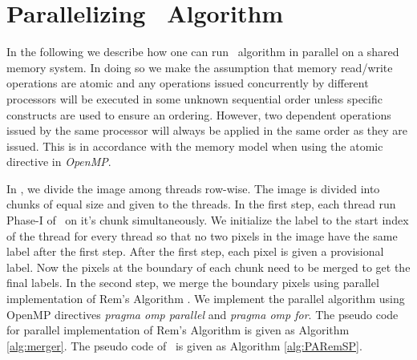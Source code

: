 \section{Parallelizing \aremsp\ Algorithm}
\label{sec:parallel_algo}

In the following we describe how one can run \aremsp\ algorithm in parallel
on a shared memory system. In doing so we make the assumption that memory read/write 
operations are atomic and any operations issued concurrently by different processors will be executed in some unknown 
sequential order unless specific constructs are used to ensure an ordering.
However, two dependent operations issued by 
the same processor will always be applied in the same order as they are issued. 
This is in accordance with the memory model when using the atomic directive in
{\em OpenMP}.

In \paremsp, we divide the image among threads row-wise. The image is
divided into chunks of equal size and given to the threads. In the first step,
each thread run Phase-I of \aremsp\ on it's chunk simultaneously. We
initialize the label to the start index of the thread for every thread so that no 
two pixels in the image have the same label after the first step. After the first step, 
each pixel is given a provisional label. Now the pixels at the boundary of each chunk need to 
be merged to get the final labels. In the second step, we merge the boundary pixels using parallel 
implementation of Rem's Algorithm \cite{Patwary2012_PARemSP}. We implement the parallel algorithm using
OpenMP directives {\em pragma omp parallel} and {\em pragma omp for}. The
pseudo code for parallel implementation of Rem's Algorithm is given as Algorithm
\ref{alg:merger}. The pseudo code of \paremsp\ is given as Algorithm
\ref{alg:PARemSP}.

 